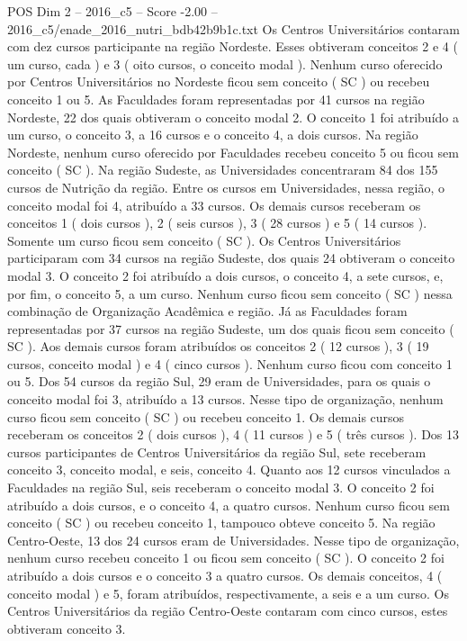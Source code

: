 \begin{textsample}{POS Dim 2 – 2016\_c5 – Score -2.00 – 2016\_c5/enade\_2016\_nutri\_bdb42b9b1c.txt}
Os Centros Universitários contaram com dez cursos participante na região Nordeste.
Esses obtiveram conceitos 2 e 4 ( um curso, cada ) e 3 ( oito cursos, o conceito modal ).
Nenhum curso oferecido por Centros Universitários no Nordeste ficou sem conceito ( SC ) ou recebeu conceito 1 ou 5.
As Faculdades foram representadas por 41 cursos na região Nordeste, 22 dos quais obtiveram o conceito modal 2.
O conceito 1 foi atribuído a um curso, o conceito 3, a 16 cursos e o conceito 4, a dois cursos.
Na região Nordeste, nenhum curso oferecido por Faculdades recebeu conceito 5 ou ficou sem conceito ( SC ).
Na região Sudeste, as Universidades concentraram 84 dos 155 cursos de Nutrição da região.
Entre os cursos em Universidades, nessa região, o conceito modal foi 4, atribuído a 33 cursos.
Os demais cursos receberam os conceitos 1 ( dois cursos ), 2 ( seis cursos ), 3 ( 28 cursos ) e 5 ( 14 cursos ).
Somente um curso ficou sem conceito ( SC ).
Os Centros Universitários participaram com 34 cursos na região Sudeste, dos quais 24 obtiveram o conceito modal 3.
O conceito 2 foi atribuído a dois cursos, o conceito 4, a sete cursos, e, por fim, o conceito 5, a um curso.
Nenhum curso ficou sem conceito ( SC ) nessa combinação de Organização Acadêmica e região.
Já as Faculdades foram representadas por 37 cursos na região Sudeste, um dos quais ficou sem conceito ( SC ).
Aos demais cursos foram atribuídos os conceitos 2 ( 12 cursos ), 3 ( 19 cursos, conceito modal ) e 4 ( cinco cursos ).
Nenhum curso ficou com conceito 1 ou 5.
Dos 54 cursos da região Sul, 29 eram de Universidades, para os quais o conceito modal foi 3, atribuído a 13 cursos.
Nesse tipo de organização, nenhum curso ficou sem conceito ( SC ) ou recebeu conceito 1.
Os demais cursos receberam os conceitos 2 ( dois cursos ), 4 ( 11 cursos ) e 5 ( três cursos ).
Dos 13 cursos participantes de Centros Universitários da região Sul, sete receberam conceito 3, conceito modal, e seis, conceito 4.
Quanto aos 12 cursos vinculados a Faculdades na região Sul, seis receberam o conceito modal 3.
O conceito 2 foi atribuído a dois cursos, e o conceito 4, a quatro cursos.
Nenhum curso ficou sem conceito ( SC ) ou recebeu conceito 1, tampouco obteve conceito 5.
Na região Centro-Oeste, 13 dos 24 cursos eram de Universidades.
Nesse tipo de organização, nenhum curso recebeu conceito 1 ou ficou sem conceito ( SC ).
O conceito 2 foi atribuído a dois cursos e o conceito 3 a quatro cursos.
Os demais conceitos, 4 ( conceito modal ) e 5, foram atribuídos, respectivamente, a seis e a um curso.
Os Centros Universitários da região Centro-Oeste contaram com cinco cursos, estes obtiveram conceito 3.

\end{textsample}
